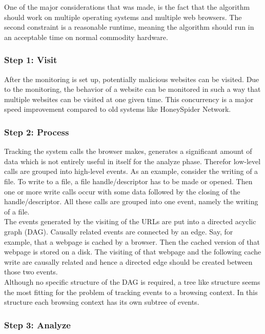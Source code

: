 One of the major considerations that was made, is the fact that the algorithm should work on multiple operating systems and multiple web browsers. The second constraint is a reasonable runtime, meaning the algorithm should run in an acceptable time on normal commodity hardware.

\subsubsection{Step 1: Visit}

After the monitoring is set up, potentially malicious websites can be visited. Due to the monitoring, the behavior of a website can be monitored in such a way that multiple websites can be visited at one given time. This concurrency is a major speed improvement compared to old systems like HoneySpider Network.


\subsubsection{Step 2: Process}

Tracking the system calls the browser makes, generates a significant amount of data which is not entirely useful in itself for the analyze phase. Therefor low-level calls are grouped into high-level events. As an example, consider the writing of a file. To write to a file, a file handle/descriptor has to be made or opened. Then one or more write calls occur with some data followed by the closing of the handle/descriptor. All these calls are grouped into one event, namely the writing of a file.\\


The events generated by the visiting of the URLs are put into a directed acyclic graph (DAG). Causally related events are connected by an edge. Say, for example, that a webpage is cached by a browser. Then the cached version of that webpage is stored on a disk. The visiting of that webpage and the following cache write are causally related and hence a directed edge should be created between those two events.\\

Although no specific structure of the DAG is required, a tree like structure seems the most fitting for the problem of tracking events to a browsing context. In this structure each browsing context has its own subtree of events. 



\subsubsection{Step 3: Analyze}

